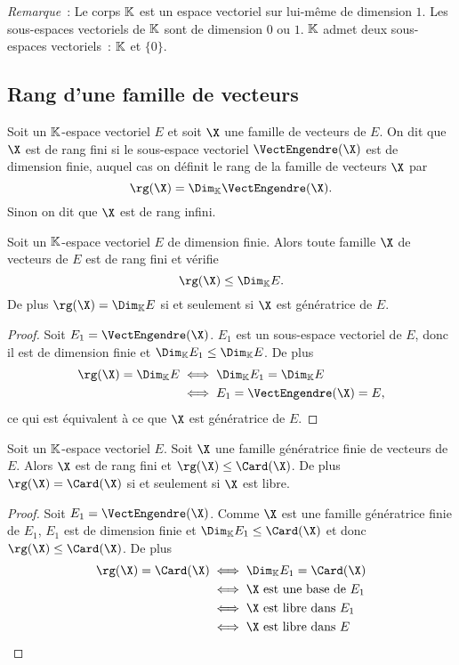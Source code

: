 \emph{Remarque}~: Le corps $\mathbb{K}$ est un espace vectoriel sur lui-même de dimension $1$. Les sous-espaces vectoriels de $\mathbb{K}$ sont de dimension $0$ ou $1$. $\mathbb{K}$ admet deux sous-espaces vectoriels~: $\mathbb{K}$ et $\{0\}$.

\subsection{Rang d'une famille de vecteurs}

\begin{defdef}
  Soit un $\mathbb{K}$-espace vectoriel $E$ et soit $\X$ une famille de vecteurs de $E$. On dit que $\X$ est de rang fini si le sous-espace vectoriel $\VectEngendre(\X)$ est de dimension finie, auquel cas on définit le rang de la famille de vecteurs $\X$ par
  \begin{equation}
    \rg(\X)=\Dim_\K \VectEngendre(\X).
  \end{equation}
  Sinon on dit que $\X$ est de rang infini.
\end{defdef}

\begin{prop}
  Soit un $\mathbb{K}$-espace vectoriel $E$ de dimension finie. Alors toute famille $\X$ de vecteurs de $E$ est de rang fini et vérifie
  \begin{equation}
    \rg(\X) \leq \Dim_\K E.
  \end{equation}
De plus $\rg(\X) = \Dim_\K E$ si et seulement si $\X$ est génératrice de $E$.
\end{prop}
\begin{proof}
  Soit $E_1=\VectEngendre(\X)$. $E_1$ est un sous-espace vectoriel de $E$, donc il est de dimension finie et $\Dim_\K E_1 \leq \Dim_\K E$. De plus
  \begin{align}
    \rg(\X) = \Dim_\K E &\iff \Dim_\K E_1 = \Dim_\K E\\
    & \iff E_1=\VectEngendre(\X)=E,
  \end{align}
  ce qui est équivalent à ce que $\X$ est génératrice de $E$.
\end{proof}

\begin{prop}\label{prop:caracrangbase}
   Soit un $\mathbb{K}$-espace vectoriel $E$. Soit $\X$ une famille génératrice finie de vecteurs de $E$. Alors $\X$ est de rang fini et $\rg(\X) \leq \Card(\X)$. De plus $\rg(\X)=\Card(\X)$ si et seulement si $\X$ est libre.
\end{prop}
\begin{proof}
  Soit $E_1=\VectEngendre(\X)$. Comme $\X$ est une famille génératrice finie de $E_1$, $E_1$ est de dimension finie et $\Dim_\K E_1 \leq \Card(\X)$ et donc $\rg(\X) \leq \Card(\X)$. De plus 
  \begin{align}
    \rg(\X) = \Card(\X) &\iff \Dim_\K E_1 = \Card(\X)\\
    &\iff \X \text{~est une base de } E_1\\
    &\iff \X \text{~est libre dans } E_1\\
    &\iff \X \text{~est libre dans } E\\
  \end{align}
\end{proof}


